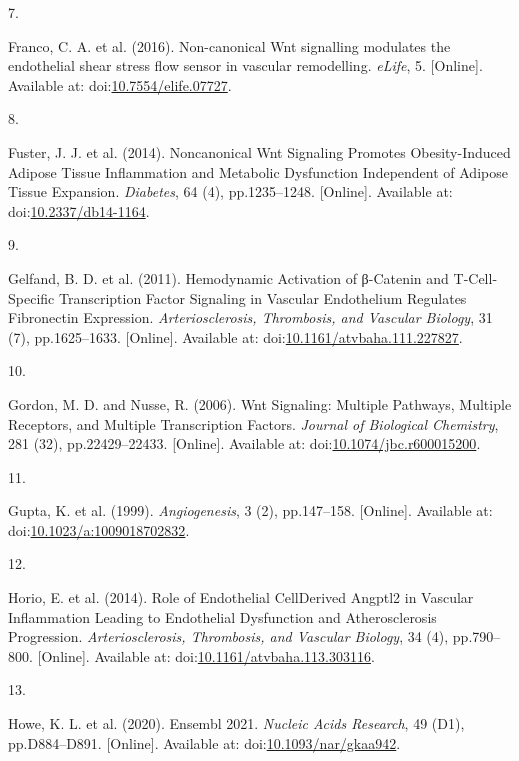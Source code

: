 \documentclass[
  11pt,
]{article}
\newlength{\cslhangindent}
\newlength{\csllabelwidth}
\newlength{\cslentryspacingunit} %
\newenvironment{CSLReferences}[2] %
 {%
  \setlength{\parindent}{0pt}
  \ifodd #1
  \let\oldpar\par
  \def\par{\hangindent=\cslhangindent\oldpar}
  \fi
  \setlength{\parskip}{#2\cslentryspacingunit}
 }%
 {}
\newcommand{\CSLLeftMargin}[1]{\parbox[t]{\csllabelwidth}{#1}}
\newcommand{\CSLRightInline}[1]{\parbox[t]{\linewidth - \csllabelwidth}{#1}\break}
\begin{document}
\begin{CSLReferences}{0}{0}
\leavevmode{}%
\CSLLeftMargin{7. }
\CSLRightInline{Franco, C. A. {et al.} (2016). {Non-canonical Wnt signalling modulates the endothelial shear stress flow sensor in vascular remodelling}. \emph{eLife}, 5. {[}Online{]}. Available at: doi:\href{https://doi.org/10.7554/elife.07727}{10.7554/elife.07727}.}

\leavevmode{}%
\CSLLeftMargin{8. }
\CSLRightInline{Fuster, J. J. {et al.} (2014). {Noncanonical Wnt Signaling Promotes Obesity-Induced Adipose Tissue Inflammation and Metabolic Dysfunction Independent of Adipose Tissue Expansion}. \emph{Diabetes}, 64 (4), pp.1235--1248. {[}Online{]}. Available at: doi:\href{https://doi.org/10.2337/db14-1164}{10.2337/db14-1164}.}

\leavevmode{}%
\CSLLeftMargin{9. }
\CSLRightInline{Gelfand, B. D. {et al.} (2011). {Hemodynamic Activation of β-Catenin and T-Cell-Specific Transcription Factor Signaling in Vascular Endothelium Regulates Fibronectin Expression}. \emph{Arteriosclerosis, Thrombosis, and Vascular Biology}, 31 (7), pp.1625--1633. {[}Online{]}. Available at: doi:\href{https://doi.org/10.1161/atvbaha.111.227827}{10.1161/atvbaha.111.227827}.}

\leavevmode{}%
\CSLLeftMargin{10. }
\CSLRightInline{Gordon, M. D. and Nusse, R. (2006). {Wnt Signaling: Multiple Pathways, Multiple Receptors, and Multiple Transcription Factors}. \emph{Journal of Biological Chemistry}, 281 (32), pp.22429--22433. {[}Online{]}. Available at: doi:\href{https://doi.org/10.1074/jbc.r600015200}{10.1074/jbc.r600015200}.}

\leavevmode{}%
\CSLLeftMargin{11. }
\CSLRightInline{Gupta, K. {et al.} (1999). \emph{Angiogenesis}, 3 (2), pp.147--158. {[}Online{]}. Available at: doi:\href{https://doi.org/10.1023/a:1009018702832}{10.1023/a:1009018702832}.}

\leavevmode{}%
\CSLLeftMargin{12. }
\CSLRightInline{Horio, E. {et al.} (2014). {Role of Endothelial Cell{\textendash}Derived Angptl2 in Vascular Inflammation Leading to Endothelial Dysfunction and Atherosclerosis Progression}. \emph{Arteriosclerosis, Thrombosis, and Vascular Biology}, 34 (4), pp.790--800. {[}Online{]}. Available at: doi:\href{https://doi.org/10.1161/atvbaha.113.303116}{10.1161/atvbaha.113.303116}.}

\leavevmode{}%
\CSLLeftMargin{13. }
\CSLRightInline{Howe, K. L. {et al.} (2020). {Ensembl 2021}. \emph{Nucleic Acids Research}, 49 (D1), pp.D884--D891. {[}Online{]}. Available at: doi:\href{https://doi.org/10.1093/nar/gkaa942}{10.1093/nar/gkaa942}.}


\end{CSLReferences}
\end{document}
